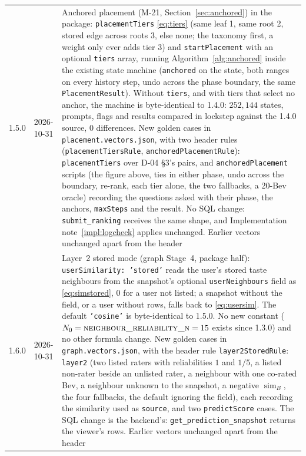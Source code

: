 \documentclass[11pt]{article}
\DeclareMathOperator{\simi}{sim}
\newcommand{\code}[1]{\texttt{#1}}
\theoremstyle{plain}
\theoremstyle{definition}
\theoremstyle{remark}
\begin{document}
\begin{center}
\begin{tabular}{@{}llp{9.5cm}@{}}
1.5.0 & 2026-10-31 & Anchored placement (M-21, Section~\ref{sec:anchored}) in the package: \code{placementTiers} \eqref{eq:tiers} (same leaf 1, same root 2, stored edge across roots 3, else none; the taxonomy first, a weight only ever adds tier 3) and \code{startPlacement} with an optional \code{tiers} array, running Algorithm~\ref{alg:anchored} inside the existing state machine (\code{anchored} on the state, both ranges on every history step, undo across the phase boundary, the same \code{PlacementResult}). Without \code{tiers}, and with tiers that select no anchor, the machine is byte-identical to 1.4.0: $252{,}144$ states, prompts, flags and results compared in lockstep against the 1.4.0 source, $0$ differences. New golden cases in \code{placement.vectors.json}, with two header rules (\code{placementTiersRule}, \code{anchoredPlacementRule}): \code{placementTiers} over D-04 \S 3's pairs, and \code{anchoredPlacement} scripts (the figure above, ties in either phase, undo across the boundary, re-rank, each tier alone, the two fallbacks, a 20-Bev oracle) recording the questions asked with their phase, the anchors, \code{maxSteps} and the result. No SQL change: \code{submit\_ranking} receives the same shape, and Implementation note~\ref{impl:logcheck} applies unchanged. Earlier vectors unchanged apart from the header \\
1.6.0 & 2026-10-31 & Layer~2 stored mode (graph Stage~4, package half): \code{userSimilarity: 'stored'} reads the user's stored taste neighbours from the snapshot's optional \code{userNeighbours} field as \eqref{eq:simstored}, $0$ for a user not listed; a snapshot without the field, or a user without rows, falls back to \eqref{eq:usersim}. The default \code{'cosine'} is byte-identical to 1.5.0. No new constant ($N_0 = \textsc{neighbour\_reliability\_n} = 15$ exists since 1.3.0) and no other formula change. New golden cases in \code{graph.vectors.json}, with the header rule \code{layer2StoredRule}: \code{layer2} (two listed raters with reliabilities $1$ and $1/5$, a listed non-rater beside an unlisted rater, a neighbour with one co-rated Bev, a neighbour unknown to the snapshot, a negative $\simi_B$, the four fallbacks, the default ignoring the field), each recording the similarity used as \code{source}, and two \code{predictScore} cases. The SQL change is the backend's: \code{get\_prediction\_snapshot} returns the viewer's rows. Earlier vectors unchanged apart from the header \\

\end{tabular}
\end{center}
\end{document}

